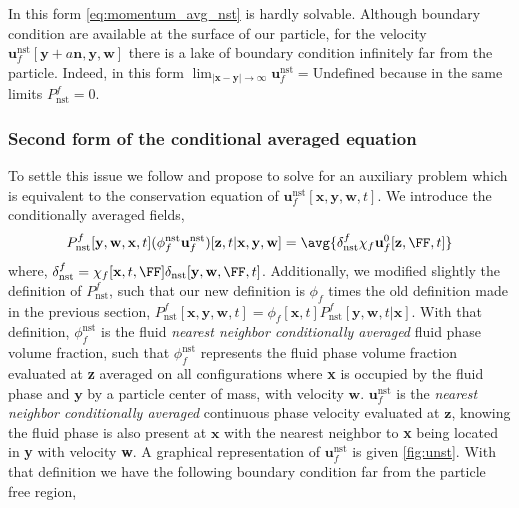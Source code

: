 In this form \ref{eq:momentum_avg_nst} is hardly solvable. 
Although boundary condition are available at the surface of our particle, for the velocity $\textbf{u}_f^\text{nst}[\textbf{y}+a \textbf{n}, \textbf{y},\textbf{w}]$ there is a lake of boundary condition infinitely far from the particle. 
Indeed, in this form $\lim_{|\textbf{x}- \textbf{y}|\to \infty} \textbf{u}^\text{nst}_f = \text{Undefined}$ because in the same limits $P_\text{nst}^f = 0$. 

\subsubsection{Second form of the conditional averaged equation}

To settle this issue we follow \citet[Appendix B]{zhang2021ensemble} and propose to solve for an auxiliary problem which is equivalent to the conservation equation of $\textbf{u}_f^\text{nst}[\textbf{x},\textbf{y},\textbf{w},t]$. 
We introduce the conditionally averaged fields, 
\begin{equation*}
    P_\text{nst}^f[\textbf{y},\textbf{w},\textbf{x},t] (\phi_f^\text{nst}\textbf{u}^\text{nst}_f)[\textbf{z},t|\textbf{x},\textbf{y},\textbf{w}]
    = \avg{\delta_\text{nst}^f \chi_f \textbf{u}^0_f[\textbf{z},\FF,t]}
\end{equation*}
where, $\delta_\text{nst}^f = \chi_f[\textbf{x},t,\FF]\delta_\text{nst}[\textbf{y},\textbf{w}, \FF,t]$. 
Additionally, we modified slightly the definition of $P_\text{nst}^f$, such that our new definition  is $\phi_f$ times the old definition made in the previous section, $P_\text{nst}^f[\textbf{x},\textbf{y},\textbf{w},t] = \phi_f[\textbf{x},t]P_\text{nst}^f[\textbf{y},\textbf{w},t|\textbf{x}]$. 
With that definition, $\phi_f^\text{nst}$ is the fluid \textit{nearest neighbor conditionally averaged} fluid phase volume fraction, such that $\phi_f^\text{nst}$ represents the fluid phase volume fraction evaluated at \textbf{z} averaged on all configurations where \textbf{x} is occupied by the fluid phase and $\textbf{y}$ by a particle center of mass, with velocity $\textbf{w}$.  
$\textbf{u}^\text{nst}_f$ is the \textit{nearest neighbor conditionally averaged} continuous phase velocity evaluated at $\textbf{z}$, knowing the fluid phase is also present at $\textbf{x}$ with the nearest neighbor to \textbf{x} being located in \textbf{y} with velocity \textbf{w}. 
A graphical representation of $\textbf{u}^\text{nst}_f$ is given \ref{fig:unst}. 
With that definition we have the following boundary condition far from the particle free region, 
